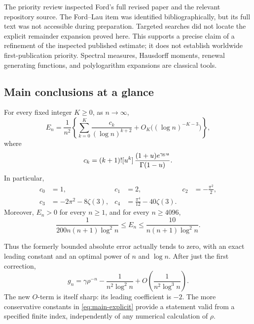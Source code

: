 The priority review inspected Ford's full revised paper and the relevant
repository source. The Ford--Lau item was identified bibliographically,
but its full text was not accessible during preparation. Targeted
searches did not locate the explicit remainder expansion proved here.
This supports a precise claim of a refinement of the inspected published
estimate; it does not establish worldwide first-publication priority.
Spectral measures, Hausdorff moments, renewal generating functions, and
polylogarithm expansions are classical tools.

\subsection{Main conclusions at a glance}

\begin{theorem}
\label{thm:main-log}
For every fixed integer $K\ge0$, as $n\to\infty$,
\begin{equation}\label{eq:main-log}
 E_n=\frac1{n^2}\left\{
    \sum_{k=0}^K\frac{c_k}{(\log n)^{k+2}}
      +O_K\bigl((\log n)^{-K-3}\bigr)\right\},
\end{equation}
where
\begin{equation}\label{eq:main-coeff}
 c_k=(k+1)![u^k]\,
           \frac{(1+u)e^{\gamma_{\!E} u}}{\Gamma(1-u)}.
\end{equation}
In particular,
\begin{align}\label{eq:first-coefficients}
 c_0&=1,&c_1&=2,&c_2&=-\frac{\pi^2}{2},\nonumber\\
 c_3&=-2\pi^2-8\zeta(3),&
 c_4&=\frac{\pi^4}{12}-40\zeta(3).
\end{align}
Moreover, $E_n>0$ for every $n\ge1$, and for every $n\ge4096$,
\begin{equation}\label{eq:main-explicit}
 \frac1{200n(n+1)\log^2n}\le E_n
           \le\frac{10}{n(n+1)\log^2n}.
\end{equation}
\end{theorem}

Thus the formerly bounded absolute error actually tends to zero, with
an exact leading constant and an optimal power of $n$ and $\log n$.
After just the first correction,
\[
 g_n=\gamma\rho^{-n}-\frac1{n^2\log^2n}
                   +O\!\left(\frac1{n^2\log^3n}\right).
\]
The new $O$-term is itself sharp: its leading coefficient is $-2$.
The more conservative constants in \eqref{eq:main-explicit} provide
a statement valid from a specified finite index, independently of
any numerical calculation of $\rho$.

